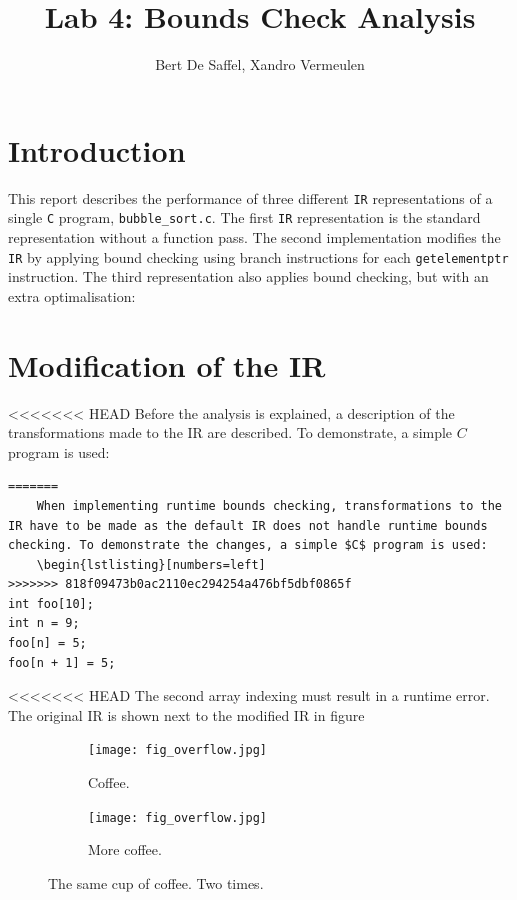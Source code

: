 \documentclass{article}
\begin{document}
	\title{Lab 4: Bounds Check Analysis}
	\author{Bert De Saffel, Xandro Vermeulen}
	\maketitle
	\tableofcontents
	
	\section{Introduction}
	This report describes the performance of three different \texttt{IR} representations of a single \texttt{C} program, \texttt{bubble\_sort.c}. The first \texttt{IR} representation is the standard representation without a function pass. The second implementation modifies the \texttt{IR} by applying bound checking using branch instructions for each \texttt{getelementptr} instruction. The third representation also applies bound checking, but with an extra optimalisation: 
	
	\section{Modification of the IR}
<<<<<<< HEAD
	Before the analysis is explained, a description of the transformations made to the IR are described. To demonstrate, a simple $C$ program is used:
	\begin{lstlisting}
=======
	When implementing runtime bounds checking, transformations to the IR have to be made as the default IR does not handle runtime bounds checking. To demonstrate the changes, a simple $C$ program is used:
	\begin{lstlisting}[numbers=left]
>>>>>>> 818f09473b0ac2110ec294254a476bf5dbf0865f
int foo[10];
int n = 9;
foo[n] = 5;
foo[n + 1] = 5;
	\end{lstlisting}
<<<<<<< HEAD
The second array indexing must result in a runtime error. The original IR is shown next to the modified IR in figure 
\begin{figure}[h!]
	\centering
	\begin{subfigure}[b]{0.4\linewidth}
		\texttt{[image: fig\_overflow.jpg]}
		\caption{Coffee.}
	\end{subfigure}
	\begin{subfigure}[b]{0.4\linewidth}
		\texttt{[image: fig\_overflow.jpg]}
		\caption{More coffee.}
	\end{subfigure}
	\caption{The same cup of coffee. Two times.}
	\label{fig:coffee}
\end{figure}
\end{document}
